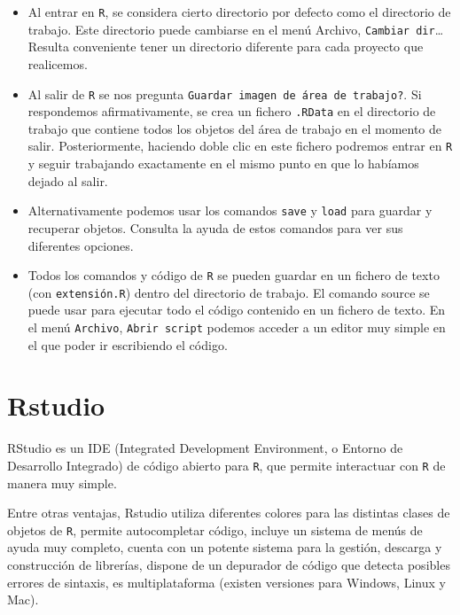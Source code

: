\documentclass[]{book}
\begin{document}
\begin{itemize}
\item
  Al entrar en \texttt{R}, se considera cierto directorio por defecto
  como el directorio de trabajo. Este directorio puede cambiarse en el
  menú Archivo, \texttt{Cambiar\ dir}\ldots{} Resulta conveniente tener
  un directorio diferente para cada proyecto que realicemos.
\item
  Al salir de \texttt{R} se nos pregunta
  \texttt{Guardar\ imagen\ de\ área\ de\ trabajo?}. Si respondemos
  afirmativamente, se crea un fichero \texttt{.RData} en el directorio
  de trabajo que contiene todos los objetos del área de trabajo en el
  momento de salir. Posteriormente, haciendo doble clic en este fichero
  podremos entrar en \texttt{R} y seguir trabajando exactamente en el
  mismo punto en que lo habíamos dejado al salir.
\item
  Alternativamente podemos usar los comandos \texttt{save} y
  \texttt{load} para guardar y recuperar objetos. Consulta la ayuda de
  estos comandos para ver sus diferentes opciones.
\item
  Todos los comandos y código de \texttt{R} se pueden guardar en un
  fichero de texto (con \texttt{extensión.R}) dentro del directorio de
  trabajo. El comando source se puede usar para ejecutar todo el código
  contenido en un fichero de texto. En el menú \texttt{Archivo},
  \texttt{Abrir\ script} podemos acceder a un editor muy simple en el
  que poder ir escribiendo el código.
\end{itemize}

\section{Rstudio}\label{rstudio}

RStudio es un IDE (Integrated Development Environment, o Entorno de
Desarrollo Integrado) de código abierto para \texttt{R}, que permite
interactuar con \texttt{R} de manera muy simple.

Entre otras ventajas, Rstudio utiliza diferentes colores para las
distintas clases de objetos de \texttt{R}, permite autocompletar código,
incluye un sistema de menús de ayuda muy completo, cuenta con un potente
sistema para la gestión, descarga y construcción de librerías, dispone
de un depurador de código que detecta posibles errores de sintaxis, es
multiplataforma (existen versiones para Windows, Linux y Mac).
\end{document}
